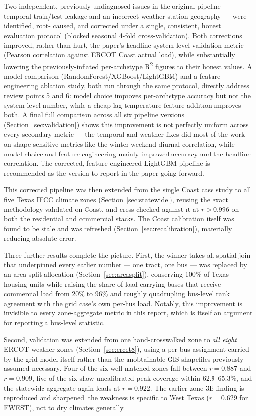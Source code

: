 \documentclass[11pt]{article}
\begin{document}
Two independent, previously undiagnosed issues in the original pipeline --- temporal
train/test leakage and an incorrect weather station geography --- were identified, root-
caused, and corrected under a single, consistent, honest evaluation protocol (blocked
seasonal 4-fold cross-validation). Both corrections improved, rather than hurt, the
paper's headline system-level validation metric (Pearson correlation against ERCOT
Coast actual load), while substantially lowering the previously-inflated per-archetype
R\textsuperscript{2} figures to their honest values. A model comparison
(RandomForest/XGBoost/LightGBM) and a feature-engineering ablation study, both run
through the same protocol, directly address review points 5 and 6: model choice
improves per-archetype accuracy but not the system-level number, while a cheap
lag-temperature feature addition improves both. A final full comparison across all
six pipeline versions (Section~\ref{sec:validation}) shows this improvement is not
perfectly uniform across every secondary metric --- the temporal and weather fixes did
most of the work on shape-sensitive metrics like the winter-weekend diurnal
correlation, while model choice and feature engineering mainly improved accuracy and
the headline correlation. The corrected, feature-engineered LightGBM pipeline is
recommended as the version to report in the paper going forward.

This corrected pipeline was then extended from the single Coast case study to all five
Texas IECC climate zones (Section~\ref{sec:statewide}), reusing the exact
methodology validated on Coast, and cross-checked against it at $r>0.996$ on both the
residential and commercial stacks. The Coast calibration itself was found to be stale
and was refreshed (Section~\ref{sec:recalibration}), materially reducing absolute
error.

Three further results complete the picture. First, the winner-takes-all spatial join
that underpinned every earlier number --- one tract, one bus --- was replaced by an
area-split allocation (Section~\ref{sec:areasplit}), conserving 100\% of Texas housing
units while raising the share of load-carrying buses that receive commercial load from
20\% to 96\% and roughly quadrupling bus-level rank agreement with the grid case's own
per-bus load. Notably, this improvement is invisible to every zone-aggregate metric in
this report, which is itself an argument for reporting a bus-level statistic.

Second, validation was extended from one hand-crosswalked zone to \emph{all eight} ERCOT
weather zones (Section~\ref{sec:ercot8}), using a per-bus assignment carried by the grid
model itself rather than the unobtainable GIS shapefiles previously assumed necessary.
Four of the six well-matched zones fall between $r=0.887$ and $r=0.909$, five of the six
show uncalibrated peak coverage within 62.9--65.3\%, and the statewide aggregate again
leads at $r=0.922$. The earlier zone-3B finding is reproduced and sharpened: the weakness is
specific to West Texas ($r=0.629$ for FWEST), not to dry climates generally.
\end{document}
